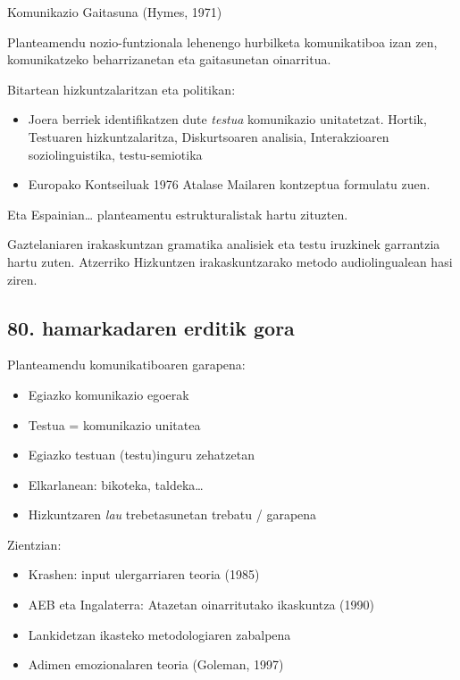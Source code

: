 \documentclass[
]{book}
\providecommand{\tightlist}{%
  \setlength{\itemsep}{0pt}\setlength{\parskip}{0pt}}
\begin{document}
Komunikazio Gaitasuna (Hymes, 1971)

Planteamendu nozio-funtzionala lehenengo hurbilketa komunikatiboa izan zen, komunikatzeko beharrizanetan eta gaitasunetan oinarritua.

Bitartean hizkuntzalaritzan eta politikan:

\begin{itemize}
\tightlist
\item
  Joera berriek identifikatzen dute \emph{testua} komunikazio unitatetzat. Hortik, Testuaren hizkuntzalaritza, Diskurtsoaren analisia, Interakzioaren soziolinguistika, testu-semiotika
\item
  Europako Kontseiluak 1976 Atalase Mailaren kontzeptua formulatu zuen.
\end{itemize}

Eta Espainian\ldots{} planteamentu estrukturalistak hartu zituzten.

Gaztelaniaren irakaskuntzan gramatika analisiek eta testu iruzkinek garrantzia hartu zuten.
Atzerriko Hizkuntzen irakaskuntzarako metodo audiolingualean hasi ziren.

\hypertarget{hamarkadaren-erditik-gora}{%
\subsection{80. hamarkadaren erditik gora}\label{hamarkadaren-erditik-gora}}

Planteamendu komunikatiboaren garapena:

\begin{itemize}
\tightlist
\item
  Egiazko komunikazio egoerak
\item
  Testua = komunikazio unitatea
\item
  Egiazko testuan (testu)inguru zehatzetan
\item
  Elkarlanean: bikoteka, taldeka\ldots{}
\item
  Hizkuntzaren \emph{lau} trebetasunetan trebatu / garapena
\end{itemize}

Zientzian:

\begin{itemize}
\tightlist
\item
  Krashen: input ulergarriaren teoria (1985)
\item
  AEB eta Ingalaterra: Atazetan oinarritutako ikaskuntza (1990)
\item
  Lankidetzan ikasteko metodologiaren zabalpena
\item
  Adimen emozionalaren teoria (Goleman, 1997)
\end{itemize}
\end{document}
